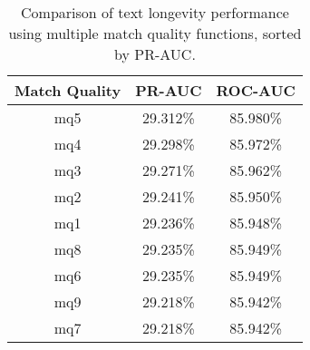 \begin{table}[tbph]
\begin{center}
\begin{tabular}{|c||c|c|}
\hline
Match Quality & PR-AUC & ROC-AUC \\
\hline
\hline
mq5 & 29.312\% & 85.980\% \\
mq4 & 29.298\% & 85.972\% \\
mq3 & 29.271\% & 85.962\% \\
mq2 & 29.241\% & 85.950\% \\
mq1 & 29.236\% & 85.948\% \\
mq8 & 29.235\% & 85.949\% \\
mq6 & 29.235\% & 85.949\% \\
mq9 & 29.218\% & 85.942\% \\
mq7 & 29.218\% & 85.942\% \\
\hline
\end{tabular}
\end{center}
\caption{Comparison of text longevity performance using
    multiple match quality functions, sorted by PR-AUC.}
\label{tab:textshoutA}
\end{table}
